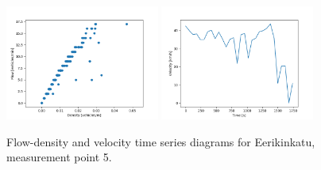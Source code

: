 \documentclass[english, 12pt, a4paper, elec, utf8, pdfa, online]{aaltothesis}
\begin{document}
\begin{figure}[ht!]
    \centering
    \includegraphics[width=0.45\textwidth]{graphs/Eerikinkatu_5_flw_dns.png}
    \includegraphics[width=0.45\textwidth]{graphs/Eerikinkatu_5_spd_time_6.png}
    \caption{Flow-density and velocity time series diagrams for Eerikinkatu, measurement point 5.}
\end{figure}
\end{document}
